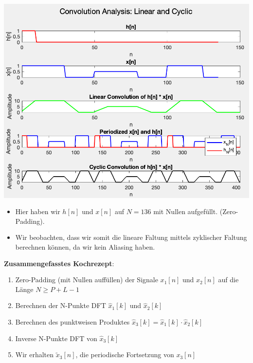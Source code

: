 \documentclass[11pt]{article}
\begin{document}
\begin{minipage}{0.45\textwidth}
    \includegraphics[width=\linewidth]{docimgs/conv_no_alias.png}
    \vspace*{-0.25cm}
    \begin{itemize}[leftmargin=0pt]
        \item[] Hier haben wir $h[n]$ und $x[n]$ auf $N=136$ mit Nullen aufgefüllt. (Zero-Padding). 
        \item[] Wir beobachten, dass wir somit die lineare Faltung mittels zyklischer Faltung berechnen können, da wir kein Aliasing haben.
    \end{itemize}
    \vspace*{2.15cm}
\end{minipage}

\pagebreak

\textbf{Zusammengefasstes Kochrezept}:
\vspace*{-0.5cm}
\begin{enumerate}
    \item Zero-Padding (mit Nullen auffüllen) der Signale $x_1[n]$ und $x_2[n]$ auf die Länge $N \geq P + L - 1$
    \item Berechnen der \textcolor{myred}{N-Punkte} DFT $\hat{x}_1[k]$ und $\hat{x}_2[k]$
    \item Berechnen des punktweisen Produktes $\hat{x}_3[k] = \hat{x}_1[k] \cdot  \hat{x}_2[k]$
    \item Inverse N-Punkte DFT von $\hat{x}_3[k]$
    \item[] Wir erhalten $\tilde{x}_3[n]$, die periodische Fortsetzung von $x_3[n]$
\end{enumerate}
\end{document}
